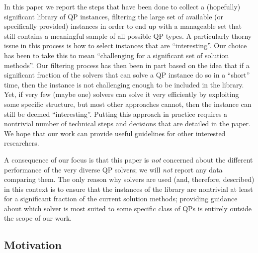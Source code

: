 In this paper we report the steps that have been done to collect a (hopefully) significant library of QP instances, filtering the large set of available (or specifically provided) instances in order to end up with a manageable set that still contains a meaningful sample of all possible QP types. A particularly thorny issue in this process is how to select instances that are ``interesting''. Our choice has been to take this to mean ``challenging for a significant set of solution methods''. Our filtering process has then been in part based on the idea that if a significant fraction of the solvers that can solve a QP instance do so in a ``short'' time, then the instance is not challenging enough to be included in the library. Yet, if very few (maybe one) solvers can solve it very efficiently by exploiting some specific structure, but most other approaches cannot, then the instance can still be deemed ``interesting''. Putting this approach in practice requires a nontrivial number of technical steps and decisions that are detailed in the paper. We hope that our work can provide useful guidelines for other interested researchers.

A consequence of our focus is that this paper is \emph{not} concerned about the different performance of the very diverse QP solvers; we will \emph{not} report any data comparing them. The only reason why solvers are used (and, therefore, described) in this context is to ensure that the instances of the library are nontrivial at least for a significant fraction of the current solution methods; providing guidance about which solver is most suited to some specific class of QPs is entirely outside the scope of our work.

\subsection{Motivation}\label{subsec:motiv}

